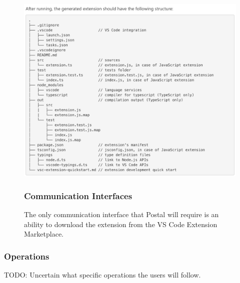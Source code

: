 \documentclass[letterpaper,10pt,titlepage,draftclsnofoot,onecolumn,onesided] {IEEEtran}
\begin{document}
\begin{figure}
\centering
\includegraphics[scale=0.5]{fileStructure.png}
\subsubsection{Communication Interfaces}
\caption{The only communication interface that Postal will require is an ability to download the extension from the VS Code Extension Marketplace.}
\end{figure}

\subsubsection{Operations}
TODO: Uncertain what specific operations the users will follow.
\end{document}
